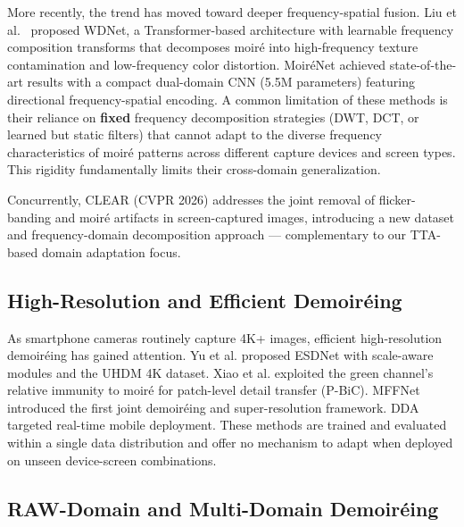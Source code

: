\documentclass[10pt,twocolumn,letterpaper]{article}
\begin{document}
More recently, the trend has moved toward deeper frequency-spatial fusion. Liu et al.~\cite{liu2020wavelet} proposed WDNet, a Transformer-based architecture with learnable frequency composition transforms that decomposes moir\'{e} into high-frequency texture contamination and low-frequency color distortion. Moir\'{e}Net \cite{anonymous2025moirenet} achieved state-of-the-art results with a compact dual-domain CNN (5.5M parameters) featuring directional frequency-spatial encoding. A common limitation of these methods is their reliance on \textbf{fixed} frequency decomposition strategies (DWT, DCT, or learned but static filters) that cannot adapt to the diverse frequency characteristics of moir\'{e} patterns across different capture devices and screen types. This rigidity fundamentally limits their cross-domain generalization.

Concurrently, CLEAR \cite{anonymous2026clear} (CVPR 2026) addresses the joint removal of flicker-banding and moir\'{e} artifacts in screen-captured images, introducing a new dataset and frequency-domain decomposition approach --- complementary to our TTA-based domain adaptation focus.

\subsection{High-Resolution and Efficient Demoir\'{e}ing}

As smartphone cameras routinely capture 4K+ images, efficient high-resolution demoir\'{e}ing has gained attention. Yu et al. \cite{yu2022towards} proposed ESDNet with scale-aware modules and the UHDM 4K dataset. Xiao et al. \cite{xiao2024pbic} exploited the green channel's relative immunity to moir\'{e} for patch-level detail transfer (P-BiC). MFFNet \cite{anonymous2025mffnet} introduced the first joint demoir\'{e}ing and super-resolution framework. DDA \cite{anonymous2023dda} targeted real-time mobile deployment. These methods are trained and evaluated within a single data distribution and offer no mechanism to adapt when deployed on unseen device-screen combinations.

\subsection{RAW-Domain and Multi-Domain Demoir\'{e}ing}
\end{document}
